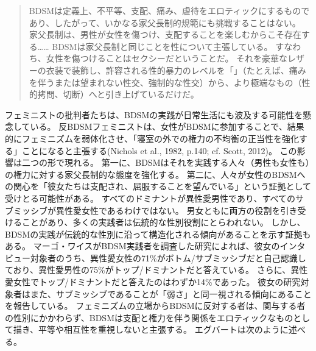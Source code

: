 \documentclass[paper=a4,book,openany]{jlreq}
\newcommand{\ig}[1]{}           %
\begin{document}
\begin{quote}
 BDSMは定義上、不平等、支配、痛み、虐待をエロティックにするものであり、したがって、いかなる家父長制的規範にも挑戦することはない。
家父長制は、男性が女性を傷つけ、支配することを楽しむからこそ存在する…… BDSMは家父長制と同じことを性について主張している。
すなわち、女性を傷つけることはセクシーだということだ。
それを豪華なレザーの衣装で装飾し、許容される性的暴力のレベルを「」（たとえば、痛みを伴うまたは望まれない性交、強制的な性交）から、より極端なもの（性的拷問、切断）へと引き上げているだけだ。
\citep{egbert15:_bdsm_faq_frequen_asser_quibb}
\end{quote}

フェミニストの批判者たちは、BDSMの実践が日常生活にも波及する可能性を懸念している。
反BDSMフェミニストは、女性がBDSMに参加することで、結果的にフェミニズムを弱体化させ、「寝室の外での権力の不均衡の正当性を強化する」ことになると主張する(Nichols et al., 1982, p.140; cf. Scott, 2012)\nocite{nichols82:_is_sadom_femin}\nocite{scott12:_think_kink}。
この影響は二つの形で現れる。
第一に、BDSMはそれを実践する人々（男性も女性も）の権力に対する家父長制的な態度を強化する。
第二に、人々が女性のBDSMへの関心を「彼女たちは支配され、屈服することを望んでいる」という証拠として受けとる可能性がある。
すべてのドミナントが異性愛男性であり、すべてのサブミッシブが異性愛女性であるわけではない。
男女ともに両方の役割を引き受けることがあり、多くの実践者は伝統的な性別役割にとらわれない。
しかし、BDSMの実践が伝統的な性別に沿って構造化される傾向があることを示す証拠もある。
マーゴ・ワイス\ig{Margo Weiss}がBDSM実践者を調査した研究によれば、彼女のインタビュー対象者のうち、異性愛女性の71\%がボトム/サブミッシブだと自己認識しており、異性愛男性の75\%がトップ/ドミナントだと答えている\citep[p.262 fn.10]{weiss11:_techn_pleas}。
さらに、異性愛女性でトップ/ドミナントだと答えたのはわずか14\%であった。
彼女の研究対象者はまた、サブミッシブであることが「弱さ」と同一視される傾向にあることを報告している\citep[p.176]{weiss11:_techn_pleas}。
フェミニズムの立場からBDSMに反対する者は、関与する者の性別にかかわらず、BDSMは支配と権力を伴う関係をエロティックなものとして描き、平等や相互性を重視しないと主張する。
エグバートは次のように述べる。
\end{document}
